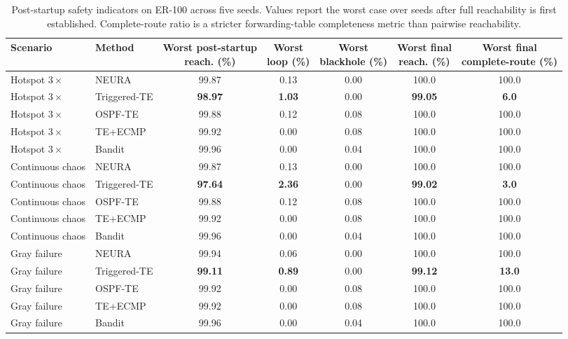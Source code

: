 \documentclass[5p,times]{elsarticle}
\begin{document}
\begin{table}[t]
\centering
\scriptsize
\caption{Post-startup safety indicators on ER-100 across five seeds. Values report the worst case over seeds after full reachability is first established. Complete-route ratio is a stricter forwarding-table completeness metric than pairwise reachability.}
\label{tab:safety}
\setlength{\tabcolsep}{16pt}
\renewcommand{\arraystretch}{1.05}
\begin{tabular}{llccccc}
\toprule
Scenario & Method &
\shortstack[c]{Worst post-startup\\reach. (\%)} &
\shortstack[c]{Worst\\loop (\%)} &
\shortstack[c]{Worst\\blackhole (\%)} &
\shortstack[c]{Worst final\\reach. (\%)} &
\shortstack[c]{Worst final\\complete-route (\%)} \\
\midrule
Hotspot $3\times$ & NEURA & 99.87 & 0.13 & 0.00 & 100.0 & 100.0 \\
Hotspot $3\times$ & Triggered-TE & \textbf{98.97} & \textbf{1.03} & 0.00 & \textbf{99.05} & \textbf{6.0} \\
Hotspot $3\times$ & OSPF-TE & 99.88 & 0.12 & 0.08 & 100.0 & 100.0 \\
Hotspot $3\times$ & TE+ECMP & 99.92 & 0.00 & 0.08 & 100.0 & 100.0 \\
Hotspot $3\times$ & Bandit & 99.96 & 0.00 & 0.04 & 100.0 & 100.0 \\
Continuous chaos & NEURA & 99.87 & 0.13 & 0.00 & 100.0 & 100.0 \\
Continuous chaos & Triggered-TE & \textbf{97.64} & \textbf{2.36} & 0.00 & \textbf{99.02} & \textbf{3.0} \\
Continuous chaos & OSPF-TE & 99.88 & 0.12 & 0.08 & 100.0 & 100.0 \\
Continuous chaos & TE+ECMP & 99.92 & 0.00 & 0.08 & 100.0 & 100.0 \\
Continuous chaos & Bandit & 99.96 & 0.00 & 0.04 & 100.0 & 100.0 \\
Gray failure & NEURA & 99.94 & 0.06 & 0.00 & 100.0 & 100.0 \\
Gray failure & Triggered-TE & \textbf{99.11} & \textbf{0.89} & 0.00 & \textbf{99.12} & \textbf{13.0} \\
Gray failure & OSPF-TE & 99.92 & 0.00 & 0.08 & 100.0 & 100.0 \\
Gray failure & TE+ECMP & 99.92 & 0.00 & 0.08 & 100.0 & 100.0 \\
Gray failure & Bandit & 99.96 & 0.00 & 0.04 & 100.0 & 100.0 \\
\bottomrule
\end{tabular}
\end{table}
\end{document}
